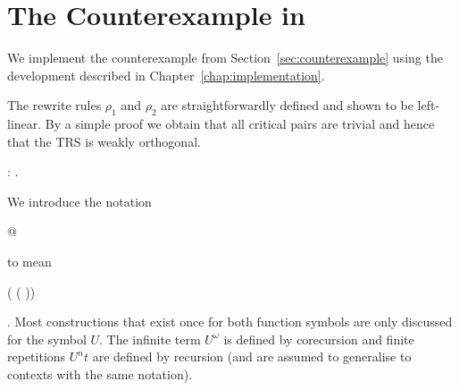 \section{The Counterexample in \Coq}

We implement the counterexample from Section~\ref{sec:counterexample}
using the \Coq development described in
Chapter~\ref{chap:implementation}.

The rewrite rules $\rho_1$ and $\rho_2$ are straightforwardly defined
and shown to be left-linear. By a simple proof we obtain that all
critical pairs are trivial and hence that the TRS is weakly
orthogonal.
\begin{singlespace}
\begin{coqdoccode}
\coqdocnoindent
{}
 :
{}.\coqdoceol
\end{coqdoccode}
\end{singlespace}
We introduce the notation \begin{coqdoccode} @
  \end{coqdoccode} to mean
\begin{coqdoccode}
   ( 
  (
  ))\end{coqdoccode}. Most
constructions that exist once for both function symbols are only
discussed for the symbol $U$. The infinite term $U^\omega$ is defined
by corecursion and finite repetitions $U^n t$ are defined by recursion
(and are assumed to generalise to contexts with the same notation).
